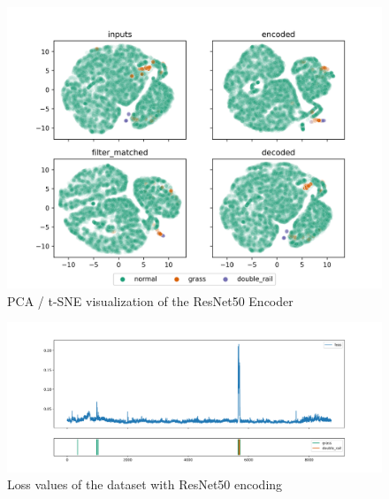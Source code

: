 \begin{figure}[!ht]
    \centering
    \includegraphics[width=\textwidth,trim={0 1cm 0 1cm},clip]{./results/resnet50_vgg19/20230514_213740_feature_vectors_1.png}
    \caption{PCA / t-SNE visualization of the ResNet50 Encoder}
    \label{fig:resnet50_pca}
\end{figure}



\begin{figure}[!ht]
    \centering
    \includegraphics[width=\textwidth,trim={0 1cm 0 1cm},clip]{./results/resnet50_vgg19/20230514_213740_feature_vectors_loss.png}
    \caption{Loss values of the dataset with ResNet50 encoding}
    \label{fig:resnet50_loss}
\end{figure}



